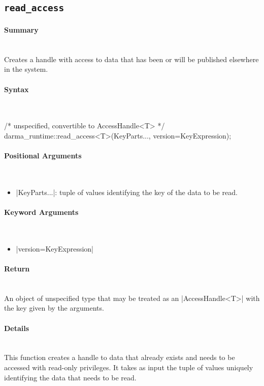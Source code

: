 \subsection{\texttt{read\_access}}
\label{ssec:api_fe_read_access}

\paragraph{Summary}\mbox{}\\
Creates a handle with  access to data that has been or will be
published elsewhere in the system.

\paragraph{Syntax}\mbox{}\\
\begin{CppCode}
/* unspecified, convertible to AccessHandle<T> */
darma_runtime::read_access<T>(KeyParts..., version=KeyExpression);
\end{CppCode}

\paragraph{Positional Arguments}\mbox{}\\
\begin{itemize}
  \item |KeyParts...|: tuple of values identifying the key of the data to
  be read.
\end{itemize}

\paragraph{Keyword Arguments}\mbox{}\\
\begin{itemize}
  \item |version=KeyExpression| 
\end{itemize}


\paragraph{Return}\mbox{}\\
An object of unspecified type that may be treated as an |AccessHandle<T>|
with the key given by the arguments.

\paragraph{Details}\mbox{}\\
This function creates a handle to data that already exists and 
needs to be accessed with read-only privileges. 
It takes as input the tuple of values uniquely 
identifying the data that needs to be read.  

